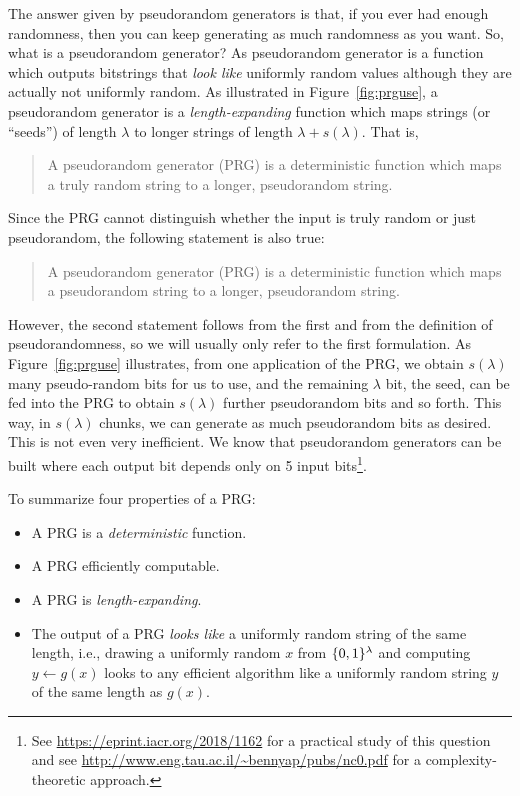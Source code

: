 \documentclass[a4paper,table,dvipsnames]{article}
\theoremstyle{definition}
\begin{document}
The answer given by pseudorandom generators is that, if you ever had enough
randomness, then you can keep generating as much randomness as you want. So,
what is a pseudorandom generator? As pseudorandom generator is a function which
outputs bitstrings that \emph{look like} uniformly random values although they
are actually not uniformly random. As illustrated in Figure~\ref{fig:prguse},
a pseudorandom generator is a \emph{length-expanding} function which maps
strings (or ``seeds'') of length $\lambda$ to longer strings of length $\lambda+s(\lambda)$.
That is,
\begin{quote}
  A pseudorandom generator (PRG) is a deterministic function which maps
	a truly random string to a longer, pseudorandom string.
\end{quote}
Since the PRG cannot distinguish whether the input is truly random or just
pseudorandom, the following statement is also true:
\begin{quote}
  A pseudorandom generator (PRG) is a deterministic function which maps
	a pseudorandom string to a longer, pseudorandom string.
\end{quote}
However, the second statement follows from the first and from the definition
of pseudorandomness, so we will usually only refer to the first formulation.
As Figure~\ref{fig:prguse} illustrates, from one application of the PRG, we
obtain $s(\lambda)$ many pseudo-random bits for us to use, and the remaining
$\lambda$ bit, the seed, can be fed into the PRG to obtain $s(\lambda)$ further
pseudorandom bits and so forth. This way, in $s(\lambda)$ chunks, we can generate
as much pseudorandom bits as desired. This is not even very inefficient. We know
that pseudorandom generators can be built where each output bit depends only on
5 input bits\footnote{See \url{https://eprint.iacr.org/2018/1162} for a practical
study of this question and see \url{http://www.eng.tau.ac.il/~bennyap/pubs/nc0.pdf}
for a complexity-theoretic approach.}.

To summarize four properties of a PRG:
\begin{itemize}
\item A PRG is a \emph{deterministic} function.
\item A PRG efficiently computable.
\item A PRG is \emph{length-expanding}.
\item The output of a PRG \emph{looks like} a uniformly random string of the same length, i.e., drawing a uniformly random $x$ from $\{0,1\}^\lambda$ and computing $y\gets g(x)$ looks to any efficient algorithm like a uniformly random string $y$ of the same length as $g(x)$.
\end{itemize}
\end{document}
